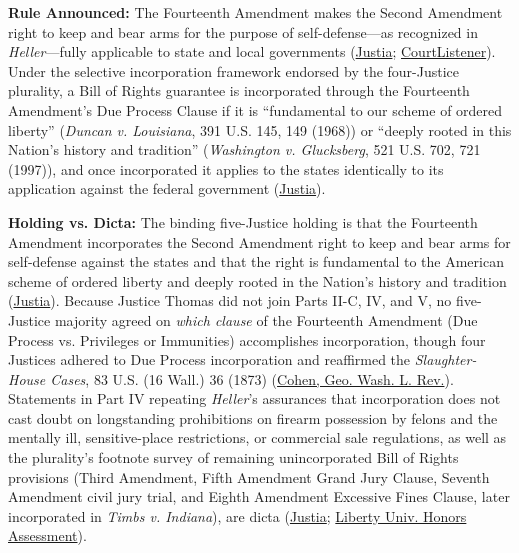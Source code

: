 \documentclass[12pt]{article}
\begin{document}
\textbf{Rule Announced:} The Fourteenth Amendment makes the Second Amendment right to keep and bear arms for the purpose of self-defense---as recognized in \textit{Heller}---fully applicable to state and local governments (\href{https://supreme.justia.com/cases/federal/us/561/742/}{Justia}; \href{https://www.courtlistener.com/opinion/149702/mcdonald-v-city-of-chicago/}{CourtListener}). Under the selective incorporation framework endorsed by the four-Justice plurality, a Bill of Rights guarantee is incorporated through the Fourteenth Amendment's Due Process Clause if it is ``fundamental to our scheme of ordered liberty'' (\textit{Duncan v. Louisiana}, 391 U.S. 145, 149 (1968)) or ``deeply rooted in this Nation's history and tradition'' (\textit{Washington v. Glucksberg}, 521 U.S. 702, 721 (1997)), and once incorporated it applies to the states identically to its application against the federal government (\href{https://supreme.justia.com/cases/federal/us/561/742/}{Justia}).

\textbf{Holding vs. Dicta:} The binding five-Justice holding is that the Fourteenth Amendment incorporates the Second Amendment right to keep and bear arms for self-defense against the states and that the right is fundamental to the American scheme of ordered liberty and deeply rooted in the Nation's history and tradition (\href{https://supreme.justia.com/cases/federal/us/561/742/}{Justia}). Because Justice Thomas did not join Parts II-C, IV, and V, no five-Justice majority agreed on \textit{which clause} of the Fourteenth Amendment (Due Process vs. Privileges or Immunities) accomplishes incorporation, though four Justices adhered to Due Process incorporation and reaffirmed the \textit{Slaughter-House Cases}, 83 U.S. (16 Wall.) 36 (1873) (\href{https://www.gwlr.org/wp-content/uploads/2012/08/79-3-Cohen.pdf}{Cohen, Geo. Wash. L. Rev.}). Statements in Part IV repeating \textit{Heller}'s assurances that incorporation does not cast doubt on longstanding prohibitions on firearm possession by felons and the mentally ill, sensitive-place restrictions, or commercial sale regulations, as well as the plurality's footnote survey of remaining unincorporated Bill of Rights provisions (Third Amendment, Fifth Amendment Grand Jury Clause, Seventh Amendment civil jury trial, and Eighth Amendment Excessive Fines Clause, later incorporated in \textit{Timbs v. Indiana}), are dicta (\href{https://supreme.justia.com/cases/federal/us/561/742/}{Justia}; \href{https://digitalcommons.liberty.edu/cgi/viewcontent.cgi?article=2451&context=honors}{Liberty Univ. Honors Assessment}).
\end{document}
